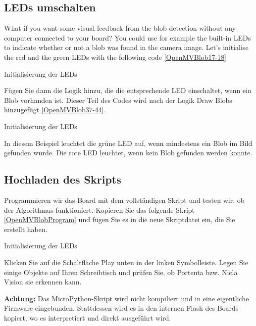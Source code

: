 \subsection{LEDs umschalten}
What if you want some visual feedback from the blob detection without any computer connected to your board? You could use for example the built-in LEDs to indicate whether or not a blob was found in the camera image. Let's initialise the red and the green LEDs with the following code \ref{OpenMVBlob17-18}

\begin{code}
	
	
	
	
	\caption{Initialisierung der LEDs}\label{OpenMVBlob17-18}
\end{code}





Fügen Sie dann die Logik hinzu, die die entsprechende LED einschaltet, wenn ein Blob vorhanden ist. Dieser Teil des Codes wird nach der Logik \glqq Draw Blobs\grqq{} hinzugefügt \ref{OpenMVBlob37-44}.




\begin{code}
	
	
	
	
	\caption{Initialisierung der LEDs}\label{OpenMVBlob37-44}
\end{code}

In diesem Beispiel leuchtet die grüne LED auf, wenn mindestens ein Blob im Bild gefunden wurde. Die rote LED leuchtet, wenn kein Blob gefunden werden konnte.

\subsection{Hochladen des Skripts}


Programmieren wir das Board mit dem vollständigen Skript und testen wir, ob der Algorithmus funktioniert. Kopieren Sie das folgende Skript \ref{OpenMVBlobProgram} und fügen Sie es in die neue Skriptdatei ein, die Sie erstellt haben.

\begin{code}
	
	
	
	
	\caption{Initialisierung der LEDs}\label{OpenMVBlobProgram}
\end{code}

Klicken Sie auf die Schaltfläche \glqq Play\grqq{} unten in der linken Symbolleiste. Legen Sie einige Objekte auf Ihren Schreibtisch und prüfen Sie, ob Portenta bzw. Nicla Vision sie erkennen kann.

\bigskip


\textbf{Achtung:} Das MicroPython-Skript wird nicht kompiliert und in eine eigentliche Firmware eingebunden. Stattdessen wird es in den internen Flash des Boards kopiert, wo es interpretiert und direkt ausgeführt wird.

